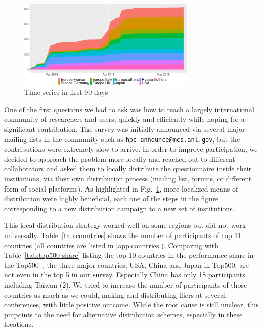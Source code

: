 \documentclass[preprint,5p,times]{elsarticle}
\begin{document}
\begin{figure}[htb]
  \begin{center}
    \includegraphics[width=8.5cm]{R-scripts/TimeSeries.pdf}
    \caption{Time series in first 90 days}
    \label{fig:time-series}
  \end{center}
\end{figure}

One of the first questions we had to ask was how to reach a largely
international community of researchers and users, quickly and
efficiently while hoping for a significant contribution.
%
The survey was initially announced via several major mailing lists in the
community such as {\tt hpc-announce@mcs.anl.gov}, but the contributions were
extremely slow to arrive. In order to improve participation, we decided to
approach the problem more locally and reached out to different collaborators and
asked them to locally distribute the questionnaire inside their institutions,
via their own distribution process (mailing list, forums, or different form of
social platforms). As highlighted in Fig.~\ref{fig:time-series}, more localized
means of distribution were highly beneficial, each one of the steps in the
figure corresponding to a new distribution campaign to a new set of
institutions.


This local distribution strategy worked well on some regions but
did not work universally. Table~\ref{tab:countries} shows the number
of participants of top 11 countries (all countries are listed in
\ref{app:countries}).
Comparing with Table~\ref{tab:top500-share} listing the top 10
countries in the performance share in the Top500~\cite{Top500}, the
three major countries, USA, China and Japan in Top500, are not even in
the top 5 in our survey. Especially China has only 18 participants
including
Taiwan (2). We tried to increase the number of participants of those
countries as much as we could, making and distributing fliers at
several conferences, with little positive outcome. While the root cause is still unclear, this pinpoints to the need for alternative distribution schemes, especially in these locations.
\end{document}
